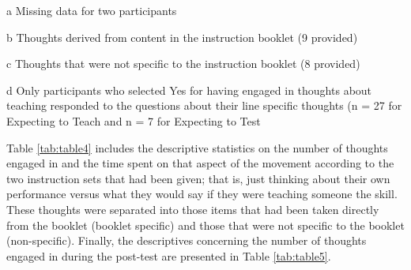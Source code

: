 \documentclass[
  english,
  man,floatsintext]{apa7}
\begin{document}
\begin{landscape}
\begin{table}
\begin{threeparttable}
\begin{tablenotes}
\item[a] Missing data for two participants
\item[b] Thoughts derived from content in the instruction booklet (9 provided)
\item[c] Thoughts that were not specific to the instruction booklet (8 provided)
\item[d] Only participants who selected Yes for having engaged in thoughts about teaching responded to the questions about their line specific thoughts (n = 27 for Expecting to Teach and n = 7 for Expecting to Test
\end{tablenotes}
\end{threeparttable}
\end{table}
\end{landscape}

Table \ref{tab:table4} includes the descriptive statistics on the number of thoughts engaged in and the time spent on that aspect of the movement according to the two instruction sets that had been given; that is, just thinking about their own performance versus what they would say if they were teaching someone the skill. These thoughts were separated into those items that had been taken directly from the booklet (booklet specific) and those that were not specific to the booklet (non-specific). Finally, the descriptives concerning the number of thoughts engaged in during the post-test are presented in Table \ref{tab:table5}.

\vspace{2em}
\end{document}
